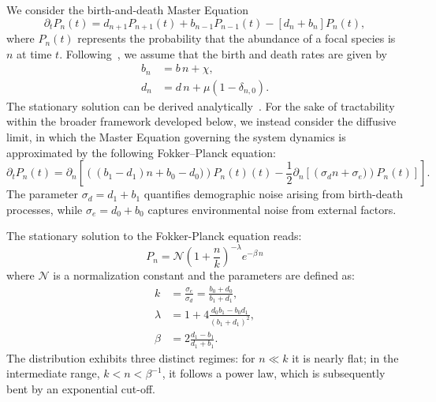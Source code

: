 \documentclass[%
 preprint,            %
 superscriptaddress, %
 amsmath,amssymb,    %
 aps,                %
 pra,                %
 floatfix,           %
]{revtex4-2}
\begin{document}
We consider the birth-and-death Master Equation
\begin{equation}
    \partial_t P_{n}(t) = d_{n+1} P_{n+1}(t) + b_{n-1} P_{n-1}(t) - [d_n + b_n] P_{n}(t),
    \label{eq:app:BD-ME}
\end{equation}
where $P_n(t)$ represents the probability that the abundance of a focal species is $n$ at time $t$. Following~\cite{he2005deriving, sergiacomi2018ubiquitous, pigani2024deviation}, we assume that the birth and death rates are given by 
\begin{align}
        b_n &= b\, n + \chi, \label{eq:app:BD-model-b}\\
        d_n &= d\, n + \mu \left(1-\delta_{n,0}\right). \label{eq:app:BD-model-d}
\end{align}
The stationary solution can be derived analytically~\cite{he2005deriving}. For the sake of tractability within the broader framework developed below, we instead consider the diffusive limit, in which the Master Equation governing the system dynamics is approximated by the following Fokker–Planck equation:
\begin{equation}
    \partial_t P_n(t) = \partial_n \left[\left((b_1-d_1)n + b_0 - d_0)\right) P_n(t)(t)
    - \frac{1}{2} \partial_n \left[\left(\sigma_d n + \sigma_e) \right)P_n(t)\right]
    \right].
\end{equation}
The parameter $\sigma_d = d_1 + b_1$ quantifies demographic noise arising from birth-death processes, while $\sigma_e = d_0 + b_0$ captures environmental noise from external factors. 

The stationary solution to the Fokker-Planck equation reads:
\begin{equation}
    P_n= \mathcal{N} \left(1+\frac{n}{k}\right)^{-\lambda} e^{-\beta\, n}
    \label{eq:SAD-mG}
\end{equation}
where $\mathcal{N}$ is a normalization constant and the parameters are defined as:
\begin{equation}
    \begin{aligned}
        k&=\frac{\sigma_e}{\sigma_d }=\frac{b_0+d_0}{b_1+d_1},\\
        \lambda &= 1 + 4 \frac{d_0 b_1 - b_0 d_1}{(b_1+d_1)^2}, \\
        \beta &= 2 \frac{d_1-b_1}{d_1+b_1}.
    \end{aligned}
    \label{eq:params-mG}
\end{equation}
The distribution exhibits three distinct regimes: for $n \ll k$ it is nearly flat; in the intermediate range, $k < n < \beta^{-1}$, it follows a power law, which is subsequently bent by an exponential cut-off.
\end{document}
